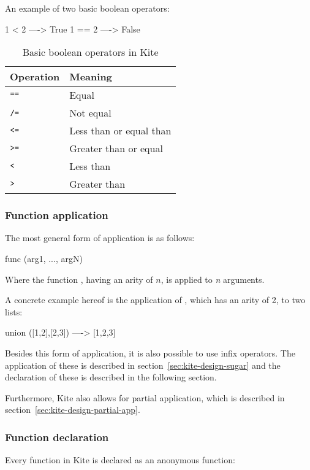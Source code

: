 \clearpage

An example of two basic boolean operators:
\begin{kite}
1 < 2  ----> True
1 == 2 ----> False
\end{kite}

\begin{table}[H]
  \centering
  \begin{tabular}{ll}
    \textbf{Operation} & \textbf{Meaning} \\ \hline
    $\texttt{==}$ & Equal                   \\ \hline
    $\texttt{/=}$ & Not equal               \\ \hline
    $\texttt{<=}$ & Less than or equal than \\ \hline
    $\texttt{>=}$ & Greater than or equal   \\ \hline
    $\texttt{<}$  & Less than               \\ \hline
    $\texttt{>}$  & Greater than            \\ \hline
  \end{tabular}
  \caption{Basic boolean operators in Kite}
\label{tbl:kite-disign-bool-op}
\end{table}

\subsubsection{Function application}
\label{sec:kite-design-func-app}
The most general form of application is as follows:
\begin{kite}
func (arg1, ..., argN)
\end{kite}

Where the function , having an arity of $n$, is applied to \emph{n} arguments.

A concrete example hereof is the application of , which has an arity of 2, to two lists:
\begin{kite}
union ([1,2],[2,3]) ----> [1,2,3]
\end{kite}

Besides this form of application, it is also possible to use infix operators. The application of these is described in section~\ref{sec:kite-design-sugar} and the declaration of these is described in the following section.

Furthermore, Kite also allows for partial application, which is described in section~\ref{sec:kite-design-partial-app}.

\subsubsection{Function declaration}
\label{sec:func-decl}
Every function in Kite is declared as an anonymous function:

